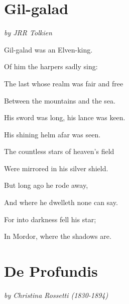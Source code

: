 \documentclass[openany]{book} %
\begin{document}
\hypertarget{toc3}{}
\pagebreak[\PAGExSUBxBREAKxPOLICY]
\section{Gil-galad}

\textit{by JRR Tolkien}

\begin{center}
            \lunep
\par\noindent Gil-galad was an Elven-king.
\par\noindent Of him the harpers sadly sing:
\par\noindent The last whose realm was fair and free
\par\noindent Between the mountains and the sea.
            \lunefull
\par\noindent His sword was long, his lance was keen.
\par\noindent His shining helm afar was seen.
\par\noindent The countless stars of heaven's field
\par\noindent Were mirrored in his silver shield.
            \soleil
\par\noindent But long ago he rode away,
\par\noindent And where he dwelleth none can say.
\par\noindent For into darkness fell his star;
\par\noindent In Mordor, where the shadows are.
            \luned
\end{center}

\bigskip

\hypertarget{toc4}{}
\pagebreak[\PAGExSUBxBREAKxPOLICY]
\section{De Profundis}

\textit{by Christina Rossetti (1830-1894)}
\end{document}
